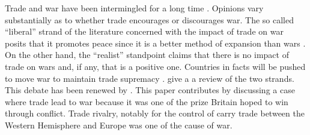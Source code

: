 \documentclass[12pt,a4paper,notitlepage,english]{article}
\begin{document}
Trade and war have been intermingled for a long time \cite{Findlay2009}.
Opinions vary substantially as to whether trade encourages or discourages war.
The so called ``liberal'' strand of the literature concerned with the impact of trade on war posits that it promotes peace since it is a better method of expansion than wars \citep{Doyle1997,Oneal1997,Polachek1980}.
On the other hand, the ``realist'' standpoint claims that there is no impact of trade on wars and, if any, that is a positive one.
Countries in facts will be pushed to move war to maintain trade supremacy \citep{Ripsman1996,Levy1990,Buzan1984}.
\cite{Mcmillan1997} give a a review of the two strands.
This debate has been renewed by  \cite{Martin2008,Martin2008a}.
This paper contributes by discussing a case where trade lead to war because it was one of the prize Britain hoped to win through conflict. Trade rivalry, notably for the control of carry trade between the Western Hemisphere and Europe was one of the cause of war.

%
\end{document}
